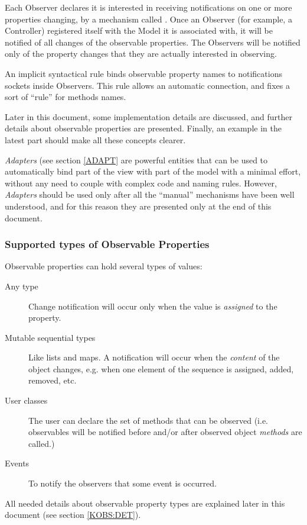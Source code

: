 Each Observer declares it is interested in receiving notifications on
one or more properties changing, by a mechanism called
. Once an Observer (for example, a Controller)
registered itself with the Model it is associated with, it will be
notified of all changes of the observable properties. The Observers
will be notified only of the property changes that they are actually
interested in observing.

An implicit syntactical rule binds observable property names to
notifications sockets inside Observers. This rule allows an automatic
connection, and fixes a sort of ``rule'' for methods names.

Later in this document, some implementation details are discussed, and
further details about observable properties are presented. Finally,
an example in the latest part should make all these concepts clearer.

\emph{Adapters} (see section \ref{ADAPT} are powerful entities that
can be used to automatically bind part of the view with part of the
model with a minimal effort, without any need to couple with complex
code and naming rules. However, \emph{Adapters} should be used only
after all the ``manual'' mechanisms have been well understood, and
for this reason they are presented only at the end of this document.


\subsubsection{\label{KOBS} Supported types of Observable Properties}

Observable properties can hold several types of values:

\begin{description}
\item [Any type] Change notification will occur only when the value is
  \emph{assigned} to the property.

\item [Mutable sequential types] Like lists and maps. A notification
  will occur when the \emph{content} of the object changes, e.g.
  when one element of the sequence is assigned, added, removed, etc.
 
\item [User classes] The user can declare the set of methods that can
  be observed (i.e. observables will be notified before and/or after
  observed object \emph{methods} are called.)

\item [Events] To notify the observers that some event is occurred.
\end{description}

All needed details about observable property types are explained later
in this document (see section \ref{KOBS:DET}).
